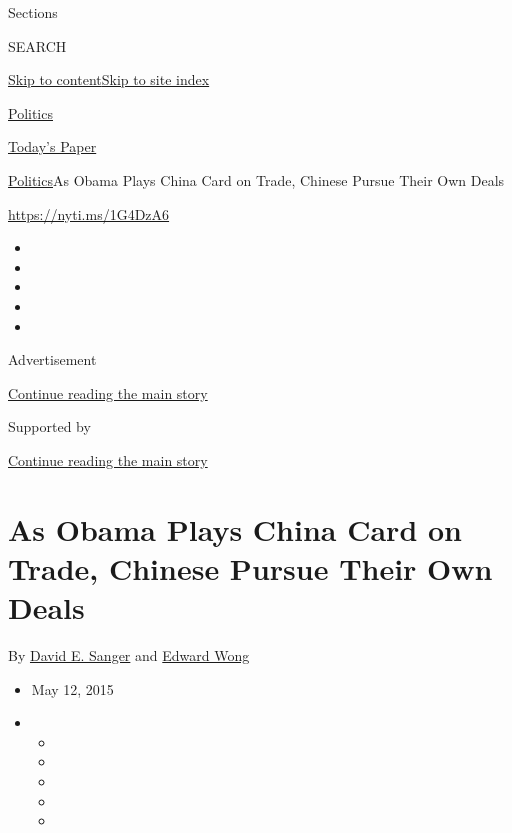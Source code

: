 Sections

SEARCH

\protect\hyperlink{site-content}{Skip to
content}\protect\hyperlink{site-index}{Skip to site index}

\href{https://www.nytimes3xbfgragh.onion/section/politics}{Politics}

\href{https://myaccount.nytimes3xbfgragh.onion/auth/login?response_type=cookie\&client_id=vi}{}

\href{https://www.nytimes3xbfgragh.onion/section/todayspaper}{Today's
Paper}

\href{/section/politics}{Politics}\textbar{}As Obama Plays China Card on
Trade, Chinese Pursue Their Own Deals

\url{https://nyti.ms/1G4DzA6}

\begin{itemize}
\item
\item
\item
\item
\item
\end{itemize}

Advertisement

\protect\hyperlink{after-top}{Continue reading the main story}

Supported by

\protect\hyperlink{after-sponsor}{Continue reading the main story}

\hypertarget{as-obama-plays-china-card-on-trade-chinese-pursue-their-own-deals}{%
\section{As Obama Plays China Card on Trade, Chinese Pursue Their Own
Deals}\label{as-obama-plays-china-card-on-trade-chinese-pursue-their-own-deals}}

By \href{http://www.nytimes3xbfgragh.onion/by/david-e-sanger}{David E.
Sanger} and
\href{http://www.nytimes3xbfgragh.onion/by/edward-wong}{Edward Wong}

\begin{itemize}
\item
  May 12, 2015
\item
  \begin{itemize}
  \item
  \item
  \item
  \item
  \item
  \end{itemize}
\end{itemize}

